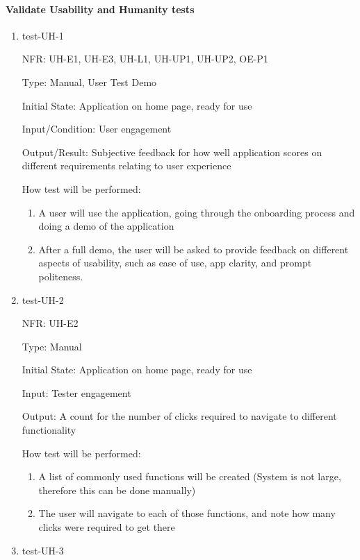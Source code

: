 \documentclass[12pt, titlepage]{article}
\begin{document}
\paragraph{Validate Usability and Humanity tests}
\begin{enumerate}

  \item{test-UH-1}
  
  NFR: UH-E1, UH-E3, UH-L1, UH-UP1, UH-UP2, OE-P1
  
  Type: Manual, User Test Demo
            
  Initial State: Application on home page, ready for use
            
  Input/Condition: User engagement
            
  Output/Result: Subjective feedback for how well application scores on different requirements relating to user experience
            
  How test will be performed: 
  \begin{enumerate}
    \item A user will use the application, going through the onboarding process
    and doing a demo of the application
    \item After a full demo, the user will be asked to provide feedback on
    different aspects of usability, such as ease of use, app clarity, and prompt
    politeness.
  \end{enumerate}
            
  \item{test-UH-2}
  
  NFR: UH-E2
  
  Type: Manual
            
  Initial State: Application on home page, ready for use
            
  Input: Tester engagement
            
  Output: A count for the number of clicks required to navigate to different functionality
            
  How test will be performed: 
  \begin{enumerate}
    \item A list of commonly used functions will be created (System is not large, therefore this can be done manually)
    \item The user will navigate to each of those functions, and note how many clicks were required to get there
  \end{enumerate}

  \item{test-UH-3}
  

\end{enumerate}
\end{document}
